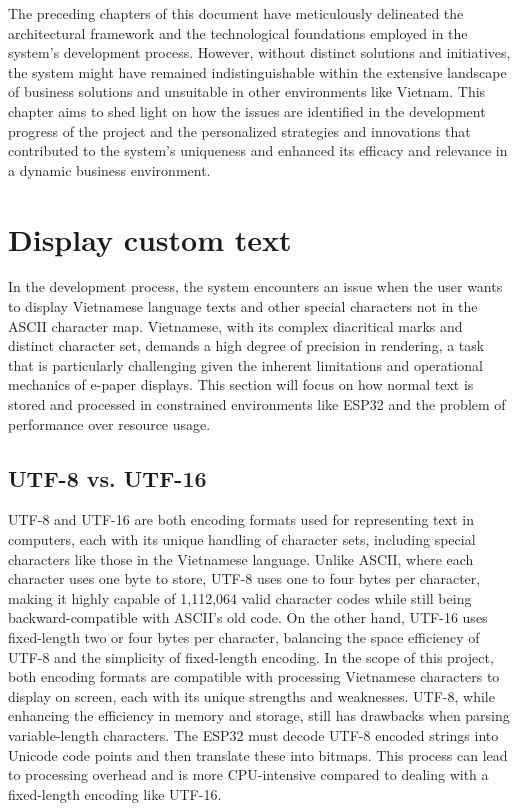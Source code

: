 \documentclass[../Main.tex]{subfiles}
\begin{document}
The preceding chapters of this document have meticulously delineated the architectural framework and the technological foundations employed in the system's development process. However, without distinct solutions and initiatives, the system might have remained indistinguishable within the extensive landscape of business solutions and unsuitable in other environments like Vietnam. This chapter aims to shed light on how the issues are identified in the development progress of the project and the personalized strategies and innovations that contributed to the system's uniqueness and enhanced its efficacy and relevance in a dynamic business environment.

\section{Display custom text}
\label{section:custom-font}
In the development process, the system encounters an issue when the user wants to display Vietnamese language texts and other special characters not in the ASCII character map. Vietnamese, with its complex diacritical marks and distinct character set, demands a high degree of precision in rendering, a task that is particularly challenging given the inherent limitations and operational mechanics of e-paper displays. This section will focus on how normal text is stored and processed in constrained environments like ESP32 and the problem of performance over resource usage. 

\subsection{UTF-8 vs. UTF-16}
\label{encoding}
UTF-8 and UTF-16 are both encoding formats used for representing text in computers, each with its unique handling of character sets, including special characters like those in the Vietnamese language. Unlike ASCII, where each character uses one byte to store, UTF-8 uses one to four bytes per character, making it highly capable of 1,112,064 valid character codes while still being backward-compatible with ASCII's old code. On the other hand, UTF-16 uses fixed-length two or four bytes per character, balancing the space efficiency of UTF-8 and the simplicity of fixed-length encoding. In the scope of this project, both encoding formats are compatible with processing Vietnamese characters to display on screen, each with its unique strengths and weaknesses. UTF-8, while enhancing the efficiency in memory and storage, still has drawbacks when parsing variable-length characters. The ESP32 must decode UTF-8 encoded strings into Unicode code points and then translate these into bitmaps. This process can lead to processing overhead and is more CPU-intensive compared to dealing with a fixed-length encoding like UTF-16.
\end{document}

